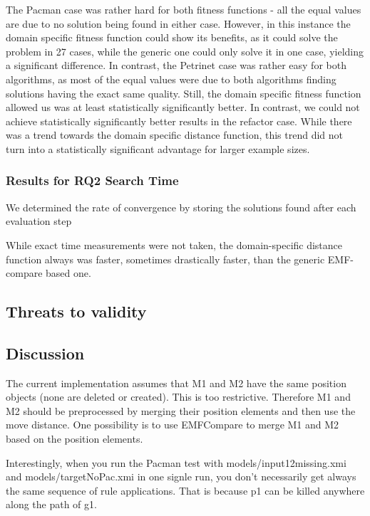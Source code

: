 The Pacman case was rather hard for both fitness functions - all the equal values are due to no solution being found in either case. However, in this instance the domain specific fitness function could show its benefits, as it could solve the problem in 27 cases, while the generic one could only solve it in one case, yielding a significant difference. In contrast, the Petrinet case was rather easy for both algorithms, as most of the equal values were due to both algorithms finding solutions having the exact same quality. Still, the domain specific fitness function allowed us was at least statistically significantly better. In contrast, we could not achieve statistically significantly better results in the refactor case. While there was a trend towards the domain specific distance function, this trend did not turn into a statistically significant advantage for larger example sizes.


\subsubsection{Results for RQ2 Search Time}

We determined the rate of convergence by storing the solutions found after each evaluation step





While exact time measurements were not taken, the domain-specific distance function always was faster, sometimes drastically faster,
than the generic EMF-compare based one. 


\subsection{Threats to validity}

\subsection{Discussion}
The current implementation assumes that M1 and M2 have the same position objects (none are deleted or created). This is too restrictive. Therefore M1 and M2 should be preprocessed by merging their position elements and then use the move distance. One possibility is to use EMFCompare to merge M1 and M2 based on the position elements.

Interestingly, when you run the Pacman test with models/input12missing.xmi and models/targetNoPac.xmi in one signle run, you don't necessarily get always the same sequence of rule applications. That is because p1 can be killed anywhere along the path of g1. 
